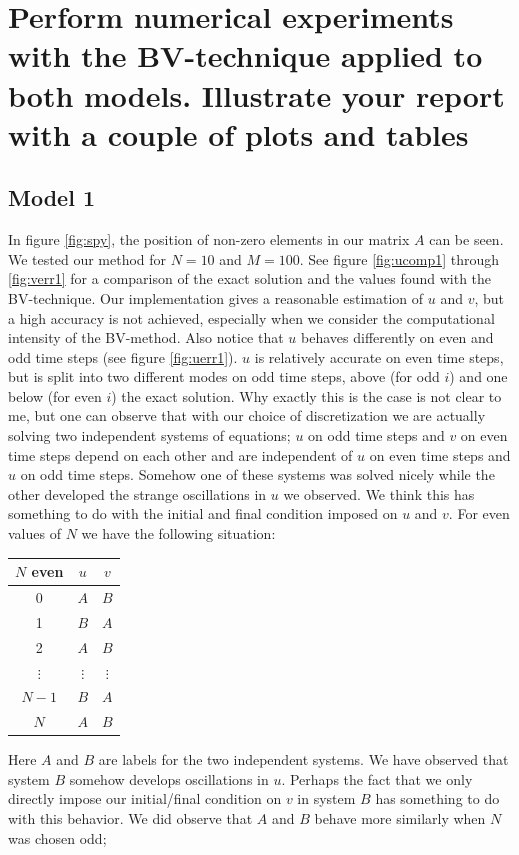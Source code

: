 \documentclass{article}
\renewcommand{\(}{\left(}
\renewcommand{\)}{\right)}
\begin{document}
\clearpage

\section*{Perform numerical experiments with the BV-technique applied to both models. Illustrate your report with a couple of plots and tables}
\subsection*{Model 1}
In figure \ref{fig:spy}, the position of non-zero elements in our matrix $A$ can be seen.
We tested our method for $N = 10$ and $M = 100$. See figure \ref{fig:ucomp1} through \ref{fig:verr1} for a comparison of the exact solution and the values found with the BV-technique. Our implementation gives a reasonable estimation of $u$ and $v$, but a high accuracy is not achieved, especially when we consider the computational intensity of the BV-method. Also notice that $u$ behaves differently on even and odd time steps (see figure \ref{fig:uerr1}). $u$ is relatively accurate on even time steps, but is split into two different modes on odd time steps, above (for odd $i$) and one below (for even $i$) the exact solution.
Why exactly this is the case is not clear to me, but one can observe that with our choice of discretization we are actually solving two independent systems of equations; $u$ on odd time steps and $v$ on even time steps depend on each other and are independent of $u$ on even time steps and $u$ on odd time steps. Somehow one of these systems was solved nicely while the other developed the strange oscillations in $u$ we observed. We think this has something to do with the initial and final condition imposed on $u$ and $v$. For even values of $N$ we have the following situation:

\begin{center}
\begin{tabular}{c|cc}
$N$ even & $u$ & $v$\\
\hline
0 & $A$ & $B$ \\
1 & $B$ & $A$ \\
2 & $A$ & $B$ \\
$\vdots$ & $\vdots$ & $\vdots$ \\
$N-1$ & $B$ & $A$ \\
$N$ & $A$ & $B$ \\
\end{tabular}
\end{center}

Here $A$ and $B$ are labels for the two independent systems. We have observed that system $B$ somehow develops oscillations in $u$. Perhaps the fact that we only directly impose our initial/final condition on $v$ in system $B$ has something to do with this behavior. We did observe that $A$ and $B$ behave more similarly when $N$ was chosen odd;
\end{document}
